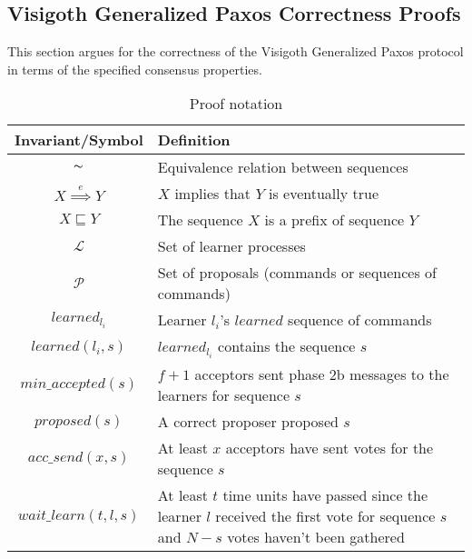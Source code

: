 \subsection{Visigoth Generalized Paxos Correctness Proofs}

This section argues for the correctness of the Visigoth Generalized Paxos protocol in terms of the specified consensus properties.\par


\begin{table}[h!]
	\renewcommand{\arraystretch}{1.5}
	\centering
	\begin{tabularx}{\linewidth}{ |c|X|}
		\hline
		Invariant/Symbol & Definition \\
		\hline
		$\thicksim$ & Equivalence relation between sequences \\
		\hline
		$X \overset{e}{\implies} Y$ & $X$ implies that $Y$ is eventually true \\
		\hline
		$X \sqsubseteq Y$ & The sequence $X$ is a prefix of sequence $Y$ \\
		\hline
		$\mathcal{L}$ & Set of learner processes \\
		\hline
		$\mathcal{P}$ & Set of proposals (commands or sequences of commands) \\
		\hline
		$learned_{l_i}$ & Learner $l_i$'s $learned$ sequence of commands \\
		\hline
		$learned(l_i,s)$ & $learned_{l_i}$ contains the sequence $s$ \\
		\hline
		$min\_accepted(s)$ & $f+1$ acceptors sent phase 2b messages to the learners for sequence $s$ \\
		\hline
		$proposed(s)$ & A correct proposer proposed $s$ \\
		\hline
		$acc\_send(x,s)$ & At least $x$ acceptors have sent votes for the sequence $s$ \\
		\hline
		$wait\_learn(t,l,s)$ & At least $t$ time units have passed since the learner $l$ received the first vote for sequence $s$ and $N-s$ votes haven't been gathered\\
		\hline
  	\end{tabularx} 
	\caption{Proof notation} 
	\label{table:vft_proof}
\end{table}

